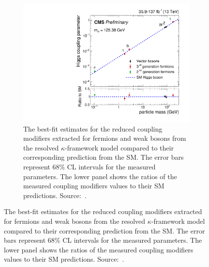 \begin{figure}[htbp]
\begin{subfigure}[htbp]{0.48\textwidth}
  \end{subfigure}
  \hfill
  \begin{subfigure}[htbp]{0.48\textwidth}
    \centering
    \includegraphics[width=\textwidth]{figures_and_tables/theory/higgs_coups.pdf}
    \caption{ The best-fit estimates for the reduced coupling modifiers extracted for fermions and weak bosons from the resolved $\kappa$-framework model compared to their corresponding prediction from the SM. The error bars represent 68\% CL intervals for the measured parameters. The lower panel shows the ratios of the measured coupling modifiers values to their SM predictions. Source:~\cite{cms_higgs_mumu}.}
    \label{higgs_coups}
  \end{subfigure}
\end{figure}

